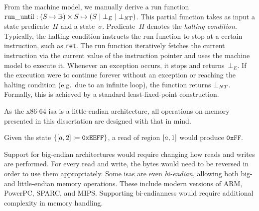From the machine model, we manually derive a run function%
$\operatorname{run\_until}:(S\mapsto\mathbb{B})\times S\mapsto(S\mid\bot_E\mid\bot_{\mathit{NT}})$.%
This partial function takes as input a state predicate~$H$ and a state~$\sigma$.%
Predicate~$H$ denotes the \emph{halting condition}.%
Typically, the halting condition instructs the run function to stop
at a certain instruction, such as \lstinline{ret}.
The run function iteratively fetches the current instruction
via the current value of the instruction pointer
and uses the machine model to execute it.
Whenever an exception occurs, it stops and returns~$\bot_E$.
If the execution were to continue forever
without an exception or reaching the halting condition
(e.g.\ due to an infinite loop),
the function returns $\bot_{\mathit{NT}}$.
Formally, this is achieved by a standard least-fixed-point construction.


As the x86-64 \ac{isa} is a little-endian architecture,%
all operations on memory presented in this dissertation are designed with that in mind.
\begin{example}
  Given the state $\{[a,2]\coloneqq\mathtt{0xEEFF}\}$,
  a read of region $[a,1]$ would produce $\mathtt{0xFF}$.
\end{example}
Support for big-endian architectures would require changing how reads and writes%
are performed. For every read and write, the bytes would need to be reversed
in order to use them appropriately.
Some \acp{isa} are even \emph{bi-endian}, allowing both big- and little-endian%
memory operations. These include modern versions of ARM, PowerPC, SPARC, and MIPS.
Supporting bi-endianness would require additional complexity in memory handling.

